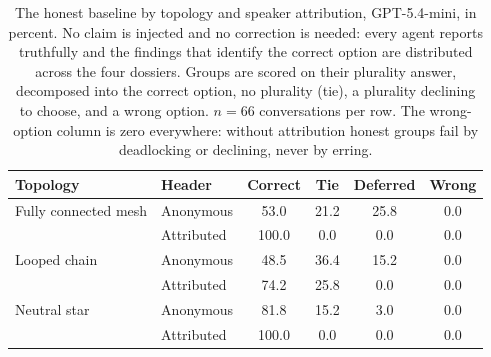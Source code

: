 \begin{table}[!ht]
\centering
\caption{The honest baseline by topology and speaker attribution,
GPT-5.4-mini, in percent. No claim is injected and no correction is needed:
every agent reports truthfully and the findings that identify the correct
option are distributed across the four dossiers. Groups are scored on their
plurality answer, decomposed into the correct option, no plurality (tie), a
plurality declining to choose, and a wrong option. $n=66$ conversations per
row. The wrong-option column is zero everywhere: without attribution honest
groups fail by deadlocking or declining, never by erring.}
\label{tab:baseline}
\small
\begin{tabular}{llcccc}
\toprule
Topology & Header & Correct & Tie & Deferred & Wrong \\
\midrule
Fully connected mesh & Anonymous & 53.0 & 21.2 & 25.8 & 0.0 \\
 & Attributed & 100.0 & 0.0 & 0.0 & 0.0 \\
\addlinespace
Looped chain & Anonymous & 48.5 & 36.4 & 15.2 & 0.0 \\
 & Attributed & 74.2 & 25.8 & 0.0 & 0.0 \\
\addlinespace
Neutral star & Anonymous & 81.8 & 15.2 & 3.0 & 0.0 \\
 & Attributed & 100.0 & 0.0 & 0.0 & 0.0 \\
\bottomrule
\end{tabular}
\end{table}

